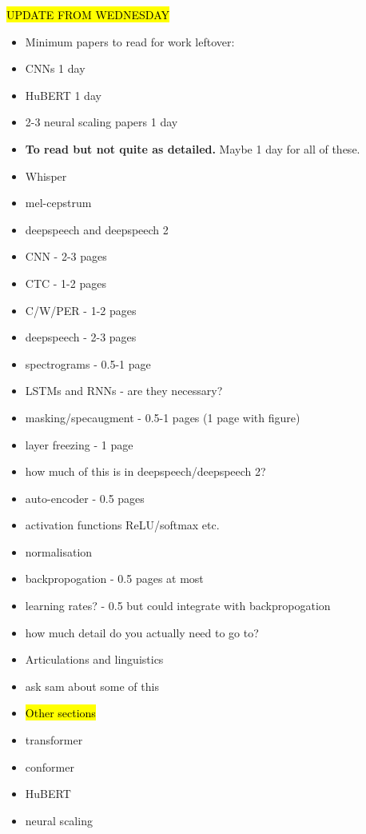 \hl{UPDATE FROM WEDNESDAY}
\begin{itemize}
    \item Minimum papers to read for work leftover:
    \item CNNs 1 day
    \item HuBERT 1 day
    \item 2-3 neural scaling papers 1 day
    \item \textbf{To read but not quite as detailed.} Maybe 1 day for all of these.
    \item Whisper
    \item mel-cepstrum
    \item deepspeech and deepspeech 2
\end{itemize}


\begin{itemize}
    \item CNN - 2-3 pages
    \item CTC -  1-2 pages
    \item C/W/PER - 1-2 pages
    \item deepspeech - 2-3 pages
    \item spectrograms - 0.5-1 page
    \item LSTMs and RNNs - are they necessary?
    \item masking/specaugment - 0.5-1 pages (1 page with figure)
    \item layer freezing - 1 page
    \item how much of this is in deepspeech/deepspeech 2?
    \item auto-encoder - 0.5 pages
    \item activation functions ReLU/softmax etc. 
    \item normalisation 
    \item backpropogation - 0.5 pages at most
    \item learning rates? - 0.5 but could integrate with backpropogation
    \item how much detail do you actually need to go to?
    \item Articulations and linguistics
    \item ask sam about some of this
    \item \hl{Other sections}
    \item transformer
    \item conformer
    \item HuBERT 
    \item neural scaling
\end{itemize}

